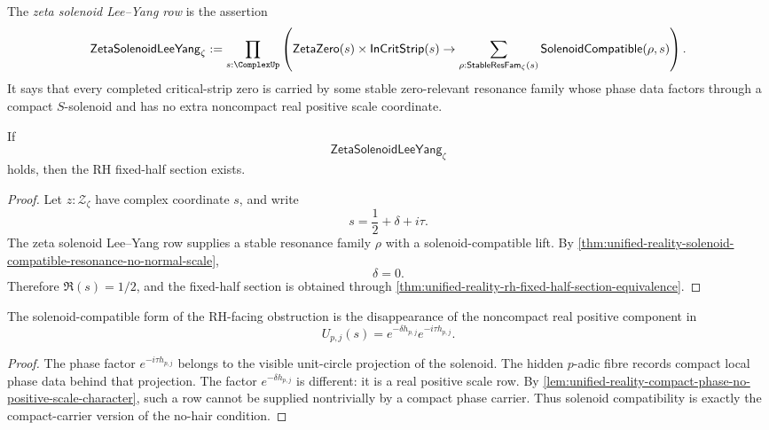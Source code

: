 \begin{definition}
\label{def:unified-reality-zeta-solenoid-lee-yang-row}
The \emph{zeta solenoid Lee--Yang row} is the assertion
$$
\mathsf{ZetaSolenoidLeeYang}_{\zeta}
:=
\prod_{s:\ComplexUp}
\left(
\mathsf{ZetaZero}(s)
\times
\mathsf{InCritStrip}(s)
\to
\sum_{\rho:\mathsf{StableResFam}_{\zeta}(s)}
\mathsf{SolenoidCompatible}(\rho,s)
\right).
$$
It says that every completed critical-strip zero is carried by some
stable zero-relevant resonance family whose phase data factors through a
compact $S$-solenoid and has no extra noncompact real positive scale
coordinate.
\end{definition}

\begin{theorem}
\label{thm:unified-reality-solenoid-lee-yang-conditionally-sufficient}
If
$$
\mathsf{ZetaSolenoidLeeYang}_{\zeta}
$$
holds, then the RH fixed-half section exists.
\end{theorem}

\begin{proof}
Let $z:\mathcal Z_{\zeta}$ have complex coordinate $s$, and write
$$
s=\frac12+\delta+i\tau.
$$
The zeta solenoid Lee--Yang row supplies a stable resonance family
$\rho$ with a solenoid-compatible lift.  By
\autoref{thm:unified-reality-solenoid-compatible-resonance-no-normal-scale},
$$
\delta=0.
$$
Therefore $\Re(s)=1/2$, and the fixed-half section is obtained through
\autoref{thm:unified-reality-rh-fixed-half-section-equivalence}.
\end{proof}

\begin{corollary}
\label{cor:unified-reality-solenoid-compatibility-compact-no-hair-row}
The solenoid-compatible form of the RH-facing obstruction is the
disappearance of the noncompact real positive component in
$$
U_{p,j}(s)
=
e^{-\delta h_{p,j}}e^{-i\tau h_{p,j}}.
$$
\end{corollary}

\begin{proof}
The phase factor $e^{-i\tau h_{p,j}}$ belongs to the visible unit-circle
projection of the solenoid.  The hidden $p$-adic fibre records compact
local phase data behind that projection.  The factor
$e^{-\delta h_{p,j}}$ is different: it is a real positive scale row.  By
\autoref{lem:unified-reality-compact-phase-no-positive-scale-character},
such a row cannot be supplied nontrivially by a compact phase carrier.
Thus solenoid compatibility is exactly the compact-carrier version of
the no-hair condition.
\end{proof}

